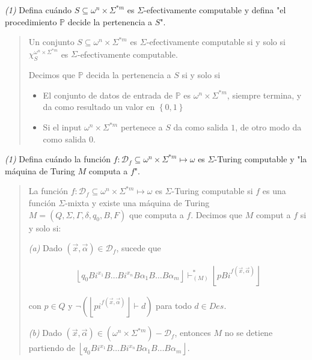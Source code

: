 \documentclass[a4paper, 12pt]{article}
\begin{document}
\pagebreak 

\textit{(1)} Defina cuándo $S \subseteq \omega^{n} \times \Sigma^{*m} $ es
$\Sigma$-efectivamente computable y defina "el procedimiento $\mathbb{P}$ decide
la pertenencia a $S$".


\small
\begin{quote}

Un conjunto $S \subseteq \omega^{n} \times \Sigma^{*m} $ es
$\Sigma$-efectivamente computable si y solo si $\chi_S^{\omega^{n} \times
\Sigma^{*m} }$ es $\Sigma$-efectivamente computable.

Decimos que $\mathbb{P}$ decida la pertenencia a $S$ si y solo si 

\begin{itemize}
    \item El conjunto de datos de entrada de $\mathbb{P}$ es $\omega^{n} \times
        \Sigma^{*m} $, siempre termina, y da como resultado un valor en $\left\{
        0, 1\right\} $
    \item Si el input $\omega^{n} \times \Sigma^{*m} $ pertenece a $S$ da como
        salida $1$, de otro modo da como salida $0$.

\end{itemize}


\end{quote}
\normalsize

\pagebreak 

\textit{(1)} Defina cuándo la función $f : \mathcal{D}_f \subseteq \omega^{n} \times
\Sigma^{*m} \mapsto \omega$ es $\Sigma$-Turing computable y "la
máquina de Turing $M$ computa a $f$".


\small
\begin{quote}

La función $f : \mathcal{D}_f \subseteq \omega^{n} \times \Sigma^{*m} \mapsto
\omega$ es $\Sigma$-Turing computable si $f$ es una función $\Sigma$-mixta y
existe una máquina de Turing $M = (Q, \Sigma, \Gamma, \delta, q_0, B, F)$ que
computa a $f$. Decimos que $M$ comput a $f$ si y solo si: 


\textit{(a)} Dado $(\vec{x}, \vec{\alpha}) \in \mathcal{D}_f$, sucede que 

\begin{align*}
    \left\lfloor q_0 B i^{x_1} B \ldots B i^{x_n} B \alpha_1 B \ldots B \alpha_m
    \right\rfloor \vdash^{*}_{(M)} \left\lfloor p B i^{f(\vec{x}, \vec{\alpha}) } \right\rfloor
\end{align*}

con $p \in Q$ y $\neg \left(\left\lfloor p i^{f(\vec{x}, \vec{\alpha}) } \right\rfloor
\vdash d\right)$ para todo $d \in Des$.

\textit{(b)} Dado $(\vec{x}, \vec{\alpha}) \in (\omega^{n} \times \Sigma^{*m} )
- \mathcal{D}_f$, entonces $M$ no se detiene partiendo de $\left\lfloor q_0 B
i^{x_1} B \ldots B i^{x_n} B \alpha_1 B \ldots B \alpha_m \right\rfloor$.

\end{quote}
\normalsize
\end{document}

